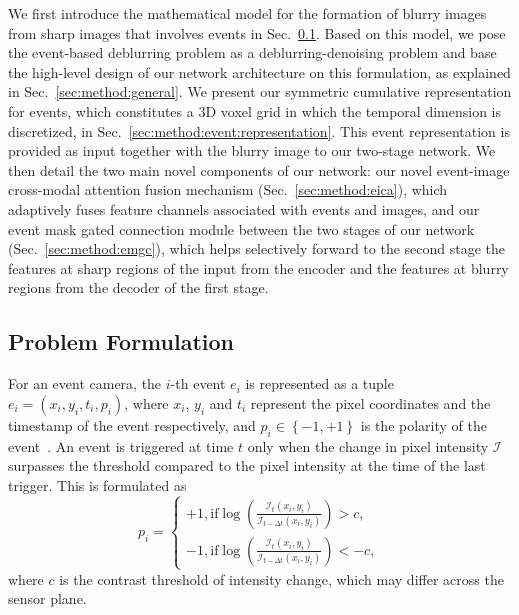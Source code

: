 \documentclass[runningheads]{llncs}
\newlength \g
\begin{document}
We first introduce the mathematical model for the formation of blurry images from sharp images that involves events in Sec.~\ref{sec:method:theory}. Based on this model, we pose the event-based deblurring problem as a deblurring-denoising problem and base the high-level design of our network architecture on this formulation, as explained in Sec.~\ref{sec:method:general}. We present our symmetric cumulative representation for events, which constitutes a 3D voxel grid in which the temporal dimension is discretized, in Sec.~\ref{sec:method:event:representation}. This event representation is provided as input together with the blurry image to our two-stage network. We then detail the two main novel components of our network: our novel event-image cross-modal attention fusion mechanism (Sec.~\ref{sec:method:eica}), which adaptively fuses feature channels associated with events and images, and our event mask gated connection module between the two stages of our network (Sec.~\ref{sec:method:emgc}), which helps selectively forward to the second stage the features at sharp regions of the input from the encoder and the features at blurry regions from the decoder of the first stage.

\subsection{Problem Formulation}
\label{sec:method:theory}


For an event camera, the $i$-th event $e_i$ is represented as a tuple $e_i = (x_i, y_i, t_i, p_i)$, where $x_i$, $y_i$ and $t_i$ represent the pixel coordinates and the timestamp of the event respectively, and $p_i\in \left \{ -1, +1  \right \}$ is the polarity of the event~\cite{brandli2014240,patrick2008128x}. An event is triggered at time $t$ only when the change in pixel intensity $\mathcal{I}$ surpasses the threshold compared to the pixel intensity at the time of the last trigger. This is formulated as 
\begin{equation}
\label{eq:event_polarity}
p_i = 
\begin{cases}
+1, \text{if} \log \left( \frac{\mathcal{I}_t {(x_i, y_i)}} {\mathcal{I}_{ t - \Delta t} {(x_i, y_i)} } \right) > c, \\
-1, \text{if} \log \left( \frac{\mathcal{I}_t {(x_i, y_i)}} {\mathcal{I}_{ t - \Delta t} {(x_i, y_i)} } \right) < -c,
\end{cases}
\end{equation}
where $c$ is the contrast threshold of intensity change, which may differ across the sensor plane.
\end{document}
